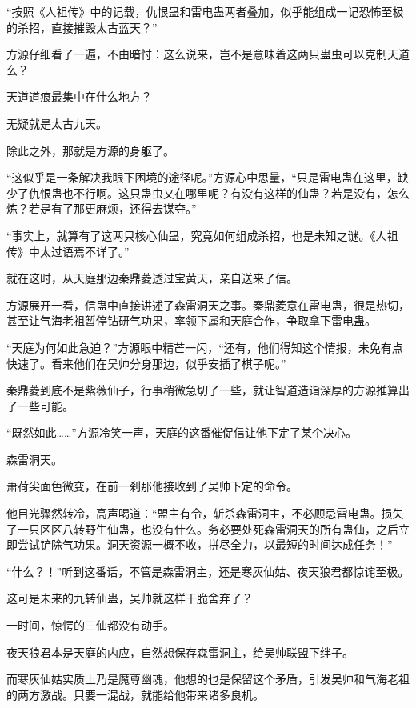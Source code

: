 
\begin{this_body}



“按照《人祖传》中的记载，仇恨蛊和雷电蛊两者叠加，似乎能组成一记恐怖至极的杀招，直接摧毁太古蓝天？”

方源仔细看了一遍，不由暗忖：这么说来，岂不是意味着这两只蛊虫可以克制天道么？

天道道痕最集中在什么地方？

无疑就是太古九天。

除此之外，那就是方源的身躯了。

“这似乎是一条解决我眼下困境的途径呢。”方源心中思量，“只是雷电蛊在这里，缺少了仇恨蛊也不行啊。这只蛊虫又在哪里呢？有没有这样的仙蛊？若是没有，怎么炼？若是有了那更麻烦，还得去谋夺。”

“事实上，就算有了这两只核心仙蛊，究竟如何组成杀招，也是未知之谜。《人祖传》中太过语焉不详了。”

就在这时，从天庭那边秦鼎菱透过宝黄天，亲自送来了信。

方源展开一看，信蛊中直接讲述了森雷洞天之事。秦鼎菱意在雷电蛊，很是热切，甚至让气海老祖暂停钻研气功果，率领下属和天庭合作，争取拿下雷电蛊。

“天庭为何如此急迫？”方源眼中精芒一闪，“还有，他们得知这个情报，未免有点快速了。看来他们在吴帅分身那边，似乎安插了棋子呢。”

秦鼎菱到底不是紫薇仙子，行事稍微急切了一些，就让智道造诣深厚的方源推算出了一些可能。

“既然如此……”方源冷笑一声，天庭的这番催促信让他下定了某个决心。

森雷洞天。

萧荷尖面色微变，在前一刹那他接收到了吴帅下定的命令。

他目光骤然转冷，高声喝道：“盟主有令，斩杀森雷洞主，不必顾忌雷电蛊。损失了一只区区八转野生仙蛊，也没有什么。务必要处死森雷洞天的所有蛊仙，之后立即尝试铲除气功果。洞天资源一概不收，拼尽全力，以最短的时间达成任务！”

“什么？！”听到这番话，不管是森雷洞主，还是寒灰仙姑、夜天狼君都惊诧至极。

这可是未来的九转仙蛊，吴帅就这样干脆舍弃了？

一时间，惊愕的三仙都没有动手。

夜天狼君本是天庭的内应，自然想保存森雷洞主，给吴帅联盟下绊子。

而寒灰仙姑实质上乃是魔尊幽魂，他想的也是保留这个矛盾，引发吴帅和气海老祖的两方激战。只要一混战，就能给他带来诸多良机。


\end{this_body}
